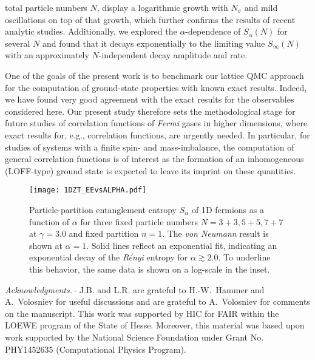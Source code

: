 \documentclass[pra,aps,groupedaddress,floatfix,twocolumn,superscriptaddress,showpacs,nofootinbib]{revtex4-1}
\begin{document}
total particle numbers $N$, {display a logarithmic growth} with $N_{\sigma}$ and mild
oscillations on top of that growth, which further confirms the results of recent analytic studies.
Additionally, we explored the $\alpha$-dependence of $S_{\alpha}(N)$ for several $N$ and found that it decays
exponentially to the limiting value $S_\infty(N)$ {with an approximately $N$-independent} decay amplitude and rate.

{One of the goals of the present work is to benchmark our lattice QMC approach for the
computation of ground-state properties with known exact results. Indeed, we have
found very good agreement with the exact results for the observables considered here.
Our present study therefore sets the methodological stage for future studies of correlation functions
of {\it Fermi} gases in higher dimensions, where exact results for, e.g., correlation functions,
are urgently needed. In particular, for studies of systems with a finite spin- and mass-imbalance,
the computation of general correlation functions is of interest as the formation of an
{inhomogeneous (LOFF-type) ground state} is expected to leave its imprint on
these quantities.}
%
\begin{figure}[t]
\texttt{[image: 1DZT\_EEvsALPHA.pdf]}
 \caption{\label{Fig:SalphaVsalpha} Particle-partition entanglement entropy $S_\alpha$ of 1D fermions as a function of $\alpha$ for
three fixed particle numbers $N=3+3,5+5,7+7$ at $\gamma=3.0$ and fixed partition $n=1$. {The {\it von Neumann} result} is shown at $\alpha = 1$. {Solid lines reflect an exponential fit, indicating an
exponential decay of the {\it R\'enyi} entropy for $\alpha \gtrsim 2.0$. To underline this behavior, the same data is shown on a log-scale in the inset.}}
\end{figure}
%

{
{\it Acknowledgments.--} J.B. and L.R. are grateful to H.-W.~Hammer
and A.~Volosniev for useful discussions {and are grateful to A.~Volosniev for comments on the manuscript}.
This work was supported by HIC for FAIR within the LOEWE program of the State of Hesse.
Moreover, this material was based upon work supported by the
National Science Foundation under Grant No.
PHY{1452635} (Computational Physics Program).
}
\end{document}
